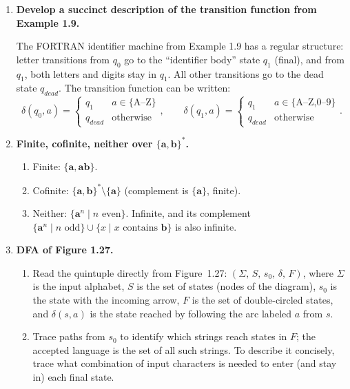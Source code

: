 \documentclass[11pt]{book}
\begin{document}
\begin{enumerate}[{1.}1.]
Therefore clause~(i) is an \emph{independent axiom}: it cannot be derived from (ii) and (iii) without additional assumptions (such as $\delta$ being injective for each input symbol).

\item \textbf{Develop a succinct description of the transition function from Example 1.9.}

The FORTRAN identifier machine from Example 1.9 has a regular structure: letter transitions from $q_0$ go to the ``identifier body'' state $q_1$ (final), and from $q_1$, both letters and digits stay in $q_1$. All other transitions go to the dead state $q_{dead}$. The transition function can be written:
\[
\delta(q_0, a) = \begin{cases} q_1 & a\in\{\text{A--Z}\}\\ q_{dead} & \text{otherwise}\end{cases},\qquad
\delta(q_1, a) = \begin{cases} q_1 & a\in\{\text{A--Z,0--9}\}\\ q_{dead} & \text{otherwise}\end{cases}.
\]

\item \textbf{Finite, cofinite, neither over $\{\mathbf{a},\mathbf{b}\}^*$.}

\begin{enumerate}
\item Finite: $\{\mathbf{a},\mathbf{ab}\}$.
\item Cofinite: $\{\mathbf{a},\mathbf{b}\}^*\setminus\{\mathbf{a}\}$ (complement is $\{\mathbf{a}\}$, finite).
\item Neither: $\{\mathbf{a}^n\mid n\text{ even}\}$. Infinite, and its complement $\{\mathbf{a}^n\mid n\text{ odd}\}\cup\{x\mid x\text{ contains }\mathbf{b}\}$ is also infinite.
\end{enumerate}

\item \textbf{DFA of Figure 1.27.}

\begin{enumerate}
\item Read the quintuple directly from Figure~1.27: $(\Sigma,\,S,\,s_0,\,\delta,\,F)$, where $\Sigma$ is the input alphabet, $S$ is the set of states (nodes of the diagram), $s_0$ is the state with the incoming arrow, $F$ is the set of double-circled states, and $\delta(s,a)$ is the state reached by following the arc labeled $a$ from $s$.
\item Trace paths from $s_0$ to identify which strings reach states in $F$; the accepted language is the set of all such strings. To describe it concisely, trace what combination of input characters is needed to enter (and stay in) each final state.
\end{enumerate}


\end{enumerate}
\end{document}
